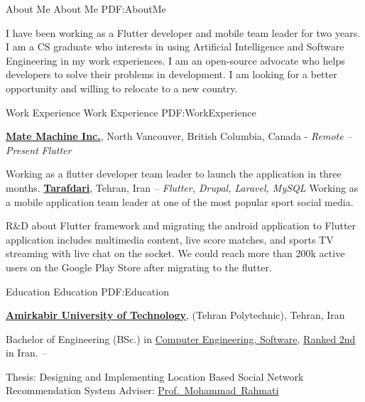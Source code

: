 \documentclass[letterpaper,MMMyyyy,nonstopmode]{resume}
\begin{document}
\begin{Body}



\Section
{About Me}
{About Me}
{PDF:AboutMe}

I have been working as a Flutter developer and mobile team leader for two years.
I am a CS graduate who interests in using Artificial Intelligence and Software Engineering in my work experiences.
I am an open-source advocate who helps developers to solve their problems in development.
I am looking for a better opportunity and willing to relocate to a new country.


\Section
{Work\newline
Experience}
{Work Experience}
{PDF:WorkExperience}

\Entry
\href{https://matemachine.com}
{\textbf{Mate Machine Inc.}},
\small{North Vancouver, British Columbia, Canada - }\textit{\small{Remote}}
\hfill
\textsl{\small{ -- Present}}
\Gap
\small{\textit{Flutter}}

\BulletItem
Working as a flutter developer team leader to launch the application in three months.
\BigGap
\Entry
\href{https://tarafdari.com}
{\textbf{Tarafdari}},
\small{Tehran, Iran}
\hfill
\textsl{\small{ -- }}
\Gap
\small{\textit{Flutter, Drupal, Laravel, MySQL}}
\BulletItem
Working as a mobile application team leader at one of the most popular sport social media.
\hfill
\normalsize{
\href{https://play.google.com/store/apps/details?id=com.tarafdari.news}
{\faAndroid}}
\begin{Detail}
\SubBulletItem
R\&D about Flutter framework and migrating the android application to Flutter
application includes multimedia content,
live score matches, and sports TV streaming with live chat on the socket.
\SubBulletItem
We could reach more than 200k active users on the Google Play Store after migrating to the flutter.
\end{Detail}


\Section
{Education}
{Education}
{PDF:Education}

\Entry
\href{https://aut.ac.ir}
{\textbf{Amirkabir University of Technology}},
\small{(Tehran Polytechnic), Tehran, Iran}

\Gap
\BulletItem
Bachelor of Engineering (BSc.) in
\href{https://ce.aut.ac.ir/en}
{Computer Engineering, Software},
\href{https://ur.isc.gov.ir/#Technology}
{Ranked 2nd}
in Iran.
\hfill
\textsl{\small{ -- }}
\begin{Detail}
\SubBulletItem
Thesis:
Designing and Implementing Location Based Social Network
Recommendation System
\SubBulletItem
Adviser:
\href{https://aut.ac.ir/cv/2416/Mohammad-Rahmati?slc_lang=en&&cv=2416&mod=scv}
{Prof.~Mohammad~Rahmati}
\end{Detail}


\end{Body}
\end{document}
